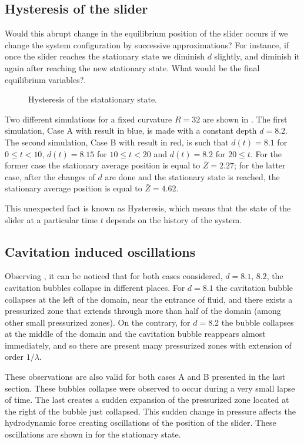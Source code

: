 \subsection{Hysteresis of the slider}
Would this abrupt change in the equilibrium position of the slider occurs if we change the system configuration by successive approximations? For instance, if once the slider reaches the stationary state we diminish $d$ slightly, and diminish it again after reaching the new stationary state. What would be the final equilibrium variables?.
\begin{figure}[ht]
 \centering 
 \def\svgwidth{\textwidth}
 \scriptsize{
}
\caption{Hysteresis of the statationary state.}\label{fig:hysteresis}
\end{figure}

Two different simulations for a fixed curvature $R=32$ are shown in . The first simulation, Case A with result in blue, is made with a constant depth $d=8.2$. The second simulation, Case B with result in red, is such that $d(t)=8.1$ for $0\leq t < 10$, $d(t)=8.15$ for $10 \leq t < 20$ and $d(t)=8.2$ for $20\leq t $. For the former case the stationary average position is equal to $\bar{Z}=2.27$; for the latter case, after the changes of $d$ are done and the stationary state is reached, the stationary average position is equal to $\bar{Z}=4.62$.

This unexpected fact is known as Hysteresis, which means that the state of the slider at a particular time $t$ depends on the history of the system.

\subsection{Cavitation induced oscillations}

Observing , it can be noticed that for both cases considered, $d=8.1,\,8.2$, the cavitation bubbles collapse in different places. For $d=8.1$ the cavitation bubble collapses at the left of the domain, near the entrance of fluid, and there exists a pressurized zone that extends through more than half of the domain (among other small pressurized zones). On the contrary, for $d=8.2$ the bubble collapses at the middle of the domain and the cavitation bubble reappears almost immediately, and so there are present many pressurized zones with extension of order $1/\lambda$.

These observations are also valid for both cases A and B presented in the last section. These bubbles collapse were observed to occur during a very small lapse of time. The last creates a sudden expansion of the pressurized zone located at the right of the bubble just collapsed. This sudden change in pressure affects the hydrodynamic force creating oscillations of the position of the slider. These oscillations are shown in  for the stationary state.

